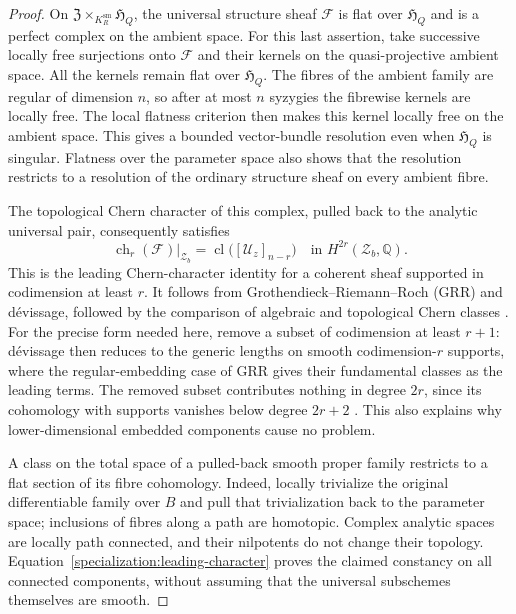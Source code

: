 \documentclass[11pt]{amsart}
\newcommand{\Q}{\mathbb Q}
\DeclareMathOperator{\cl}{cl}
\theoremstyle{definition}
\theoremstyle{remark}
\numberwithin{equation}{section}
\begin{document}
\begin{proof}
On $\mathfrak Z\times_{K_R^{\mathrm{sm}}}\mathfrak H_Q$, the universal
structure sheaf $\mathcal F$ is flat over $\mathfrak H_Q$ and is a
perfect complex on the ambient space.  For this last assertion, take
successive locally free surjections onto $\mathcal F$ and their kernels
on the quasi-projective ambient space.  All the kernels remain flat
over $\mathfrak H_Q$.  The fibres of the ambient family are regular of
dimension $n$, so after at most $n$ syzygies the fibrewise kernels are
locally free.  The local flatness criterion then makes this kernel
locally free on the ambient space.  This gives a bounded vector-bundle
resolution even when $\mathfrak H_Q$ is singular.  Flatness over the
parameter space also shows that the resolution restricts to a
resolution of the ordinary structure sheaf on every ambient fibre.

The topological Chern character of this complex, pulled back to the
analytic universal pair, consequently satisfies
\begin{equation}\label{specialization:leading-character}
 \operatorname{ch}_r(\mathcal F)|_{\mathcal Z_b}
       =\cl\bigl([\mathcal U_z]_{n-r}\bigr)
       \quad\text{in }H^{2r}(\mathcal Z_b,\Q).
\end{equation}
This is the leading Chern-character identity for a coherent sheaf
supported in codimension at least $r$.  It follows from
Grothendieck--Riemann--Roch (GRR) and d\'evissage, followed by the
comparison of algebraic and topological Chern classes
\cite[Theorem~15.2, Example~15.2.16\textup{(a)}, and
Proposition~19.1.2]{Fulton}.
For the precise form needed here, remove a subset of codimension at least
$r+1$: d\'evissage then reduces to the generic lengths on smooth
codimension-$r$ supports, where the regular-embedding case of GRR gives
their fundamental classes as the leading terms.
The removed subset contributes nothing in degree $2r$, since its
cohomology with supports vanishes below degree $2r+2$
\cite[Section~19.1, equation~(3) and Lemma~19.1.1]{Fulton}.  This also
explains why lower-dimensional embedded components cause no problem.

A class on the total space of a pulled-back smooth proper family
restricts to a flat section of its fibre cohomology.  Indeed, locally
trivialize the original differentiable family over $B$ and pull that
trivialization back to the parameter space; inclusions of fibres
along a path are homotopic.  Complex analytic spaces are locally path
connected, and their nilpotents do not change their topology.
Equation~\eqref{specialization:leading-character} proves the claimed
constancy on all connected components, without assuming that the
universal subschemes themselves are smooth.


\end{proof}
\end{document}
